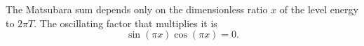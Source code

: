 \documentclass{article}
\begin{document}
The Matsubara sum depends only on the dimensionless ratio $x$ of the level energy to $2\pi T$.
The oscillating factor that multiplies it is
\begin{equation}
\sin(\pi x)\cos(\pi x) = 0 .
\label{eq:s}
\end{equation}
\end{document}
